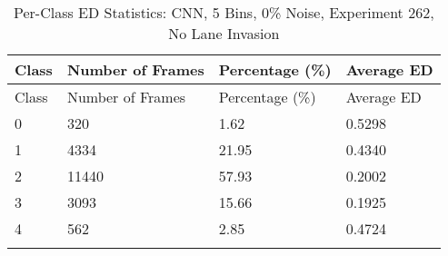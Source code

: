 








\begin{longtable}{@{}llll@{}}
\toprule
Class & Number of Frames & Percentage (\%) & Average ED \\
\midrule
\endfirsthead
\toprule
Class & Number of Frames & Percentage (\%) & Average ED \\
\midrule
\endhead
0 & 320 & 1.62 & 0.5298 \\
1 & 4334 & 21.95 & 0.4340 \\
2 & 11440 & 57.93 & 0.2002 \\
3 & 3093 & 15.66 & 0.1925 \\
4 & 562 & 2.85 & 0.4724 \\
\bottomrule
\caption{Per-Class ED Statistics: CNN, 5 Bins, 0\% Noise, Experiment 262, No Lane Invasion}
\label{tab:exp262_CNN_5bins_0noise}
\end{longtable}

